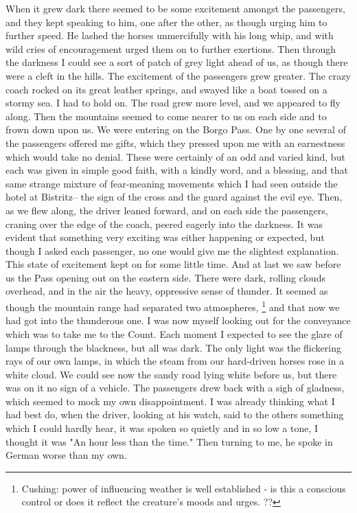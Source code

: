 When it grew dark there seemed to be some excitement amongst the passengers, and they kept speaking to him, one after the other, as though urging him to further speed. He lashed the horses unmercifully with his long whip, and with wild cries of encouragement urged them on to further exertions. Then through the darkness I could see a sort of patch of grey light ahead of us, as though there were a cleft in the hills. The excitement of the passengers grew greater. The crazy coach rocked on its great leather springs, and swayed like a boat tossed on a stormy sea. I had to hold on. The road grew more level, and we appeared to fly along. Then the mountains seemed to come nearer to us on each side and to frown down upon us. We were entering on the Borgo Pass. One by one several of the passengers offered me gifts, which they pressed upon me with an earnestness which would take no denial. These were certainly of an odd and varied kind, but each was given in simple good faith, with a kindly word, and a blessing, and that same strange mixture of fear-meaning movements which I had seen outside the hotel at Bistritz-- the sign of the cross and the guard against the evil eye. Then, as we flew along, the driver leaned forward, and on each side the passengers, craning over the edge of the coach, peered eagerly into the darkness. It was evident that something very exciting was either happening or expected, but though I asked each passenger, no one would give me the slightest explanation. This state of excitement kept on for some little time. And at last we saw before us the Pass opening out on the eastern side. There were dark, rolling clouds overhead, and in the air the heavy, oppressive sense of thunder. It seemed as though the mountain range had separated two atmospheres,
\footnote{Cushing: power of influencing weather is well established - is this a conscious control or does it reflect the creature's moods and urges. ??}
and that now we had got into the thunderous one. I was now myself looking out for the conveyance which was to take me to the Count. Each moment I expected to see the glare of lamps through the blackness, but all was dark. The only light was the flickering rays of our own lamps, in which the steam from our hard-driven horses rose in a white cloud. We could see now the sandy road lying white before us, but there was on it no sign of a vehicle. The passengers drew back with a sigh of gladness, which seemed to mock my own disappointment. I was already thinking what I had best do, when the driver, looking at his watch, said to the others something which I could hardly hear, it was spoken so quietly and in so low a tone, I thought it was "An hour less than the time." Then turning to me, he spoke in German worse than my own. 

